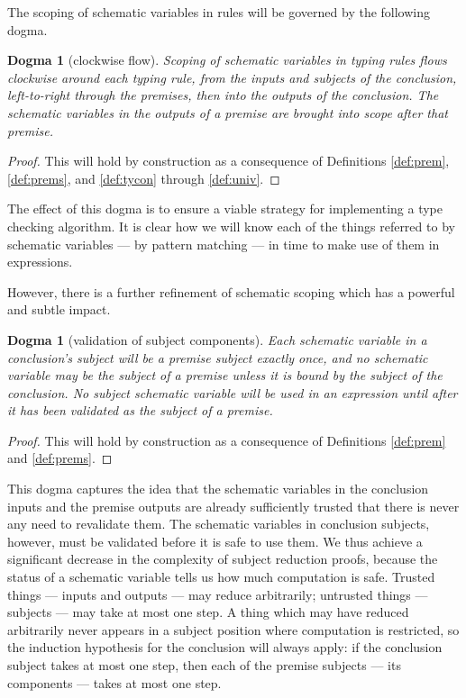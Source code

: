 \documentclass{jfp1}
\newtheorem{dogma}[theorem]{Dogma}
\begin{document}
The scoping of schematic variables in rules will be governed by the
following dogma.

\begin{dogma}[clockwise flow\label{dogma:clockwise}]
  Scoping of schematic variables in typing rules flows clockwise
  around each typing rule, from the inputs and subjects of the
  conclusion, left-to-right through the premises, then into the
  outputs of the conclusion. The schematic variables in the outputs
  of a premise are brought into scope after that premise.
\end{dogma}
\begin{proof}
  This will hold by construction as a consequence of Definitions
  \ref{def:prem}, \ref{def:prems}, and  \ref{def:tycon} through \ref{def:univ}.
\end{proof}

The effect of this dogma is to ensure a viable strategy for
implementing a type checking algorithm. It is clear how we will know
each of the things referred to by schematic variables --- by pattern
matching --- in time to make use of them in expressions.

However, there is a further refinement of schematic scoping which has
a powerful and subtle impact.

\begin{dogma}[validation of subject components\label{dogma:subject}]
  Each schematic variable in a conclusion's subject will be a premise
  subject exactly once, and no schematic variable may be the
  subject of a premise unless it is bound by the subject of the
  conclusion. No subject schematic variable will be used in an
  expression until after it has been validated as the subject of
  a premise.
\end{dogma}
\begin{proof}
  This will hold by construction as a consequence of Definitions
  \ref{def:prem} and \ref{def:prems}.
\end{proof}

This dogma captures the idea that the schematic variables in the
conclusion inputs and the premise outputs are already sufficiently
trusted that there is never any need to revalidate them. The schematic
variables in conclusion subjects, however, must be validated before it
is safe to use them. We thus achieve a significant decrease in the
complexity of subject reduction proofs, because the status of a
schematic variable tells us how much computation is safe. Trusted
things --- inputs and outputs --- may reduce arbitrarily; untrusted
things --- subjects --- may take at most one step. A thing which may
have reduced arbitrarily never appears in a subject position where
computation is restricted, so the induction hypothesis for the
conclusion will always apply: if the conclusion subject takes at most one step,
then each of the premise subjects --- its components --- takes at most
one step.
\end{document}
